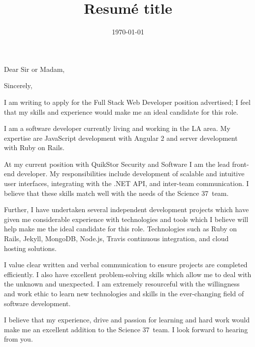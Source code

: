 \documentclass[11pt,a4paper,sans]{moderncv}        %
\title{Resumé title}                               %
\newcommand{\company}{Science 37}
\begin{document}
\recipient{\company}{}
\date{\today}
\opening{Dear Sir or Madam,}
\closing{Sincerely,}
\makelettertitle

I am writing to apply for the Full Stack Web Developer position advertised; I feel that my skills and experience would make me an ideal candidate for this role.

I am a software developer currently living and working in the LA area.
My expertise are JavaScript development with Angular 2 and server development with Ruby on Rails.

At my current position with QuikStor Security and Software  I am the lead front-end developer. 
My responsibilities include development of scalable and intuitive user interfaces, integrating with the .NET API, and inter-team communication.
I believe that these skills match well with the needs of the \company~team.

Further, I have undertaken several independent development projects which have given me considerable experience with technologies and tools which I believe will help make me the ideal candidate for this role. 
Technologies such as Ruby on Rails, Jekyll, MongoDB, Node.js, Travis continuous integration, and cloud hosting solutions.


I value clear written and verbal communication to ensure projects are completed efficiently. 
I also have excellent problem-solving skills which allow me to deal with the unknown and unexpected. 
I am extremely resourceful with the willingness and work ethic to learn new technologies and skills in the ever-changing field of software development.

I believe that my experience, drive and passion for learning and hard work would make me an excellent addition to the \company~team. 
I look forward to hearing from you.

\makeletterclosing
\end{document}
